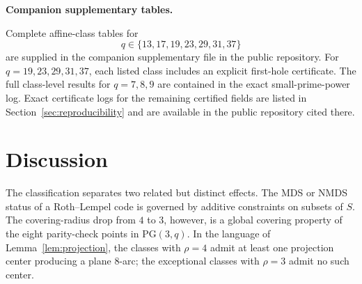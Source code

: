 ﻿\documentclass[11pt]{article}
\newcommand{\PG}{\mathrm{PG}}
\theoremstyle{plain}
\theoremstyle{definition}
\begin{document}
\noindent\textbf{Companion supplementary tables.}
\begin{sloppypar}
Complete affine-class tables for
\[
q\in\{13,17,19,23,29,31,37\}
\]
are supplied in the companion supplementary file in the public
repository.  For \(q=19,23,29,31,37\), each listed class includes an explicit
first-hole certificate.  The full class-level results for \(q=7,8,9\) are
contained in the exact small-prime-power log.  Exact certificate logs for
the remaining certified fields are listed in Section~\ref{sec:reproducibility}
and are available in the public repository cited there.
\end{sloppypar}


\section{Discussion}

The classification separates two related but distinct effects.  The MDS or
NMDS status of a Roth--Lempel code is governed by additive constraints on
subsets of \(S\).  The covering-radius drop from \(4\) to \(3\), however, is a
global covering property of the eight parity-check points in \(\PG(3,q)\).
In the language of Lemma~\ref{lem:projection}, the classes with
\(\rho=4\) admit at least one projection center producing a plane \(8\)-arc;
the exceptional classes with \(\rho=3\) admit no such center.
\end{document}
